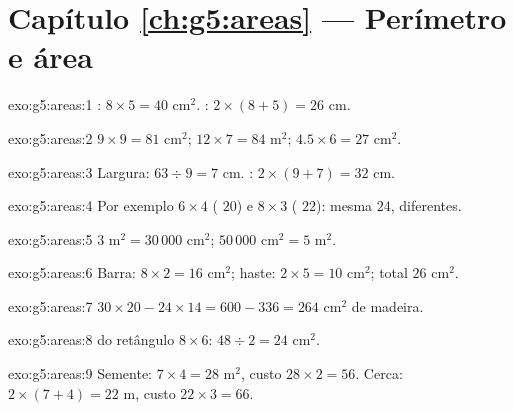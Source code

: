 \section*{Capítulo \ref{ch:g5:areas} --- Perímetro e área}

\begin{solution}{exo:g5:areas:1}
: $8 \times 5 = 40$ cm$^2$. :
$2 \times (8 + 5) = 26$ cm.
\end{solution}

\begin{solution}{exo:g5:areas:2}
$9 \times 9 = 81$ cm$^2$; \quad $12 \times 7 = 84$ m$^2$; \quad
$4.5 \times 6 = 27$ cm$^2$.
\end{solution}

\begin{solution}{exo:g5:areas:3}
Largura: $63 \div 9 = 7$ cm. : $2 \times (9 + 7) = 32$ cm.
\end{solution}

\begin{solution}{exo:g5:areas:4}
Por exemplo $6 \times 4$ ( $20$) e $8 \times 3$ (
$22$): mesma  $24$,  diferentes.
\end{solution}

\begin{solution}{exo:g5:areas:5}
$3$ m$^2 = 30\,000$ cm$^2$; \quad $50\,000$ cm$^2 = 5$ m$^2$.
\end{solution}

\begin{solution}{exo:g5:areas:6}
Barra: $8 \times 2 = 16$ cm$^2$; haste: $2 \times 5 = 10$ cm$^2$;
total $26$ cm$^2$.
\end{solution}

\begin{solution}{exo:g5:areas:7}
$30 \times 20 - 24 \times 14 = 600 - 336 = 264$ cm$^2$ de madeira.
\end{solution}

\begin{solution}{exo:g5:areas:8}
 do retângulo $8 \times 6$: $48 \div 2 = 24$ cm$^2$.
\end{solution}

\begin{solution}{exo:g5:areas:9}
Semente:  $7 \times 4 = 28$ m$^2$, custo $28 \times 2 = 56$.
Cerca:  $2 \times (7 + 4) = 22$ m, custo
$22 \times 3 = 66$.
\end{solution}

